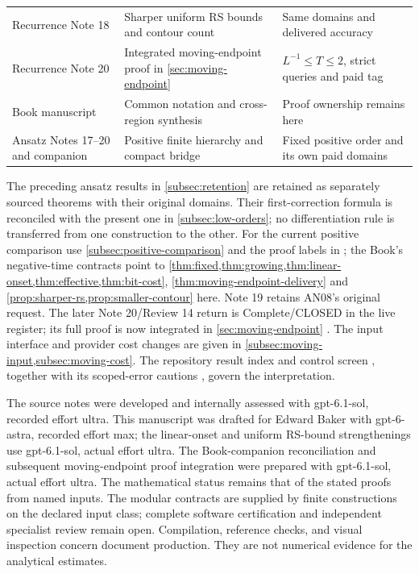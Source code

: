 \begin{center}
\begin{tabular}{@{}>{\raggedright\arraybackslash}p{}>{\raggedright\arraybackslash}p{}>{\raggedright\arraybackslash}p{}@{}}
Recurrence Note 18 &
Sharper uniform RS bounds and contour count &
Same domains and delivered accuracy\\[3pt]
Recurrence Note 20 &
Integrated moving-endpoint proof in \cref{sec:moving-endpoint} &
\(L^{-1}\le T\le2\), strict queries and paid tag\\[3pt]
Book manuscript &
Common notation and cross-region synthesis &
Proof ownership remains here\\[3pt]
Ansatz Notes 17--20 and companion &
Positive finite hierarchy and compact bridge &
Fixed positive order and its own paid domains\\
\bottomrule
\end{tabular}
\end{center}
The preceding ansatz results in \cref{subsec:retention} are
retained as separately sourced theorems with their original
domains. Their first-correction formula is reconciled with
the present one in \cref{subsec:low-orders}; no differentiation
rule is transferred from one construction to the other.
For the current positive comparison use
\cref{subsec:positive-comparison} and the proof labels in
\cite{ansatzcomp}; the Book's negative-time contracts point to
\cref{thm:fixed,thm:growing,thm:linear-onset,thm:effective,thm:bit-cost},
\cref{thm:moving-endpoint-delivery} and
\cref{prop:sharper-rs,prop:smaller-contour} here.
Note 19 retains AN08's original request. The later Note 20/Review 14
return is Complete/CLOSED in the live register; its full proof is now
integrated in \cref{sec:moving-endpoint}
\cite{rec19,rec20,rec20review,recstatus}. The input interface and
provider cost changes are given in \cref{subsec:moving-input,subsec:moving-cost}.
The repository result index and control screen
\cite{results,controls}, together with its scoped-error cautions
\cite{avoid}, govern the interpretation.

The source notes were developed and internally assessed with
gpt-6.1-sol, recorded effort ultra. This manuscript was drafted
for Edward Baker with gpt-6-astra, recorded effort max;
the linear-onset and uniform RS-bound strengthenings use gpt-6.1-sol,
actual effort ultra. The Book-companion reconciliation and subsequent moving-endpoint proof
integration were prepared with gpt-6.1-sol, actual effort ultra.
The mathematical status remains that of the stated proofs
from named inputs. The modular contracts are supplied by finite
constructions on the declared input class; complete software
certification and independent specialist review remain open.
Compilation, reference checks, and visual inspection concern
document production. They are not numerical evidence for
the analytical estimates.

